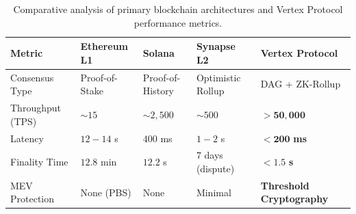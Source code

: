 \begin{table}[H]
\centering
\sffamily
\small
\begin{tabularx}{\textwidth}{lXXXX}
\toprule
\textbf{Metric} & \textbf{Ethereum L1} & \textbf{Solana} & \textbf{Synapse L2} & \textbf{Vertex Protocol} \\
\midrule
Consensus Type & Proof-of-Stake & Proof-of-History & Optimistic Rollup & DAG + ZK-Rollup \\
Throughput (TPS) & $\sim 15$ & $\sim 2,500$ & $\sim 500$ & $\mathbf{> 50,000}$ \\
Latency & $12 - 14$ s & $400$ ms & $1 - 2$ s & $\mathbf{< 200}$ \textbf{ms} \\
Finality Time & $12.8$ min & $12.2$ s & $7$ days (dispute) & $\mathbf{< 1.5}$ \textbf{s} \\
MEV Protection & None (PBS) & None & Minimal & \textbf{Threshold Cryptography} \\
\bottomrule
\end{tabularx}
\caption{Comparative analysis of primary blockchain architectures and Vertex Protocol performance metrics.}
\label{tab:comparison}
\end{table}
